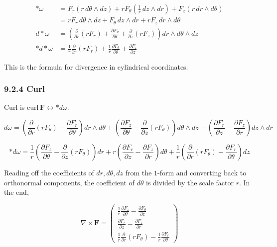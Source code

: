 \[\begin{aligned}
\ast\omega &= F_r(r\,d\theta\wedge dz) + rF_\theta\!\left(\frac{1}{r}\,dz\wedge dr\right) + F_z(r\,dr\wedge d\theta) \\
&= rF_r\,d\theta\wedge dz + F_\theta\,dz\wedge dr + rF_z\,dr\wedge d\theta \\[0.3em]
d\ast\omega &= \left(\frac{\partial}{\partial r}(rF_r) + \frac{\partial F_\theta}{\partial\theta} + \frac{\partial}{\partial z}(rF_z)\right) dr\wedge d\theta\wedge dz \\[0.3em]
\ast d\ast\omega &= \frac{1}{r}\frac{\partial}{\partial r}(rF_r) + \frac{1}{r}\frac{\partial F_\theta}{\partial\theta} + \frac{\partial F_z}{\partial z}
\end{aligned}\]

This is the formula for divergence in cylindrical coordinates.

\hypertarget{curl-2}{%
\subsubsection{9.2.4 Curl}\label{curl-2}}

Curl is \(\mathrm{curl}\,\mathbf{F} \leftrightarrow \ast d\omega\).

\[d\omega = \left(\frac{\partial}{\partial r}(rF_\theta) - \frac{\partial F_r}{\partial\theta}\right) dr\wedge d\theta + \left(\frac{\partial F_z}{\partial\theta} - \frac{\partial}{\partial z}(rF_\theta)\right) d\theta\wedge dz + \left(\frac{\partial F_r}{\partial z} - \frac{\partial F_z}{\partial r}\right) dz\wedge dr\]

\[\ast d\omega = \frac{1}{r}\!\left(\frac{\partial F_z}{\partial\theta} - \frac{\partial}{\partial z}(rF_\theta)\right)\! dr + r\!\left(\frac{\partial F_r}{\partial z} - \frac{\partial F_z}{\partial r}\right)\! d\theta + \frac{1}{r}\!\left(\frac{\partial}{\partial r}(rF_\theta) - \frac{\partial F_r}{\partial\theta}\right)\! dz\]

Reading off the coefficients of \(dr, d\theta, dz\) from the \(1\)-form
and converting back to orthonormal components, the coefficient of
\(d\theta\) is divided by the scale factor \(r\). In the end,

\[\nabla \times \mathbf{F} = \begin{pmatrix}
\frac{1}{r}\frac{\partial F_z}{\partial \theta} - \frac{\partial F_\theta}{\partial z} \\[0.3em]
\frac{\partial F_r}{\partial z} - \frac{\partial F_z}{\partial r} \\[0.3em]
\frac{1}{r}\frac{\partial}{\partial r}(r F_\theta) - \frac{1}{r}\frac{\partial F_r}{\partial \theta}
\end{pmatrix}\]

